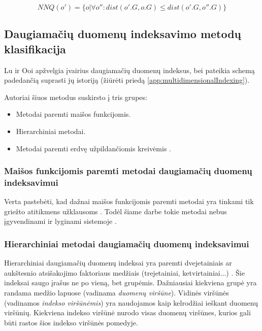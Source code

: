 \begin{equation}
	NNQ(o') = \{ o | \forall o'' : dist(o'.G, o.G) \leq dist(o'.G, o''.G) \}
\label{eq:ExactMatchQuery}
\end{equation}




\subsection{Daugiamačių duomenų indeksavimo metodų klasifikacija}
Lu ir Ooi \cite{lu1993spatial} \cite{gaede1998multidimensional} \cite{bohm2001searching} apžvelgia įvairius daugiamačių duomenų indeksus, bei pateikia schemą padedančią suprasti jų istoriją (žiūrėti priedą \ref{app:multidimensionalIndexing}).

Autoriai šiuos metodus suskirsto į tris grupes:
\begin{itemize}
	\item Metodai paremti maišos funkcijomis.
	\item Hierarchiniai metodai.
	\item Metodai paremti erdvę užpildančiomis kreivėmis \cite{bader2012space}.
\end{itemize}



\subsubsection{Maišos funkcijomis paremti metodai daugiamačių duomenų indeksavimui}


Verta pastebėti, kad dažnai maišos funkcijomis paremti metodai yra tinkami tik griežto atitikmens užklausoms \cite{nievergelt1981grid} \cite{tamminen1982excell}.
Todėl šiame darbe tokie metodai nebus įgyvendinami ir lyginami sistemoje \cite{NeurotechnologyMegamatcherAccelerator}.


\subsubsection{Hierarchiniai metodai daugiamačių duomenų indeksavimui}

Hierarchiniai daugiamačių duomenų indeksai yra paremti dvejetainiais ar aukštesnio atsišakojimo faktoriaus medžiais (trejetainiai, ketvirtainiai...) \cite{gaede1998multidimensional}.
Šie indeksai saugo įrašus ne po vieną, bet grupėmis.
Dažniausiai kiekviena grupė yra randama medžio lapuose (vadinama {\it duomenų viršūne}).
Vidinės viršūnės (vadinamos {\it indekso viršūnėmis}) yra naudojamos kaip kelrodžiai ieškant duomenų viršūnių.
Kiekviena indekso viršūnė nurodo visas duomenų viršūnes, kurios gali būti rastos šios indekso viršūnės pomedyje.

